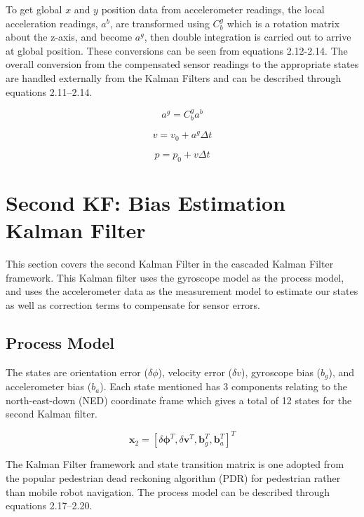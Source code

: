 To get global $x$ and $y$ position data from 
accelerometer readings, the local acceleration readings, $a^b$, are transformed using 
$C^g_b$ which is a rotation matrix about the z-axis, and become $a^g$, then double 
integration is carried out to arrive at global position. These conversions can be 
seen from equations 2.12-2.14. The overall conversion from the 
compensated sensor readings to the appropriate states are handled externally from 
the Kalman Filters and can be described through equations 2.11--2.14.

\begin{equation}
  a^g = C^g_b a^b
\end{equation}

\begin{equation}
  v = v_0 + a^g \Delta t
\end{equation}

\begin{equation}
  p = p_0 + v \Delta t
\end{equation}


\section{Second KF: Bias Estimation Kalman Filter}

This section covers the second Kalman Filter in the cascaded Kalman Filter 
framework. This Kalman filter uses the gyroscope model as the process model, 
and uses the accelerometer data as the measurement model to estimate our 
states as well as correction terms to compensate for sensor errors.

\subsection{Process Model}

The states are orientation error ($\delta\phi$), velocity error ($\delta v$), 
gyroscope bias ($b_g$), and accelerometer bias ($b_a$). Each state mentioned has 3 
components relating to the north-east-down (NED) coordinate frame which gives a 
total of 12 states for the second Kalman filter.

\begin{equation}
  \boldsymbol{x}_2 = [\delta\boldsymbol{\phi}^T, \delta\boldsymbol{v}^T,
       \boldsymbol{b}^T_g, \boldsymbol{b}^T_a]^T
\end{equation}

The Kalman Filter framework and state transition matrix is one adopted from the 
popular pedestrian dead reckoning algorithm (PDR) for pedestrian rather than mobile 
robot navigation. The process model can be described through equations 2.17--2.20. 

